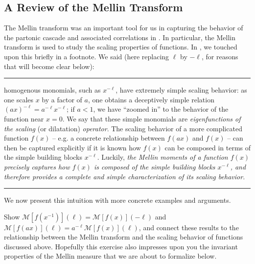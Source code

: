 \begin{subappendices}
\section{A Review of the Mellin Transform}
\label{app:mellin}

The Mellin transform was an important tool for us in capturing the behavior of the partonic cascade and associated correlations in .
%
In particular, the Mellin transform is used to study the scaling properties of functions.
%
In , we touched upon this briefly in a footnote.
%
We said (here replacing \(\ell\) by \(-\ell\), for reasons that will become clear below):

\vspace{7pt}
\hrule
\vspace{7pt}

homogenous monomials, such as \(x^{-\ell}\), have extremely simple scaling behavior:
%
as one scales \(x\) by a factor of \(a\), one obtains a deceptively simple relation \((a x)^{-\ell} = a^{-\ell} x^{-\ell}\);
%
if \(a < 1\), we have ``zoomed in'' to the behavior of the function near \(x = 0\).
%
We say that these simple monomials are \textit{eigenfunctions of the scaling} (or dilatation) \textit{operator}.
%
The scaling behavior of a more complicated function \(f(x)\) -- e.g. a concrete relationship between \(f(ax)\) and \(f(x)\) -- can then be captured explicitly if it is known how \(f(x)\) can be composed in terms of the simple building blocks \(x^{-\ell}\).
%
Luckily, \textit{the Mellin moments of a function \(f(x)\) precisely captures how \(f(x)\) is composed of the simple building blocks \(x^{-\ell}\), and therefore provides a complete and simple characterization of its scaling behavior.}

\vspace{7pt}
\hrule
\vspace{7pt}


We now present this intuition with more concrete examples and arguments.

\begin{exercise}
    Show \(\mathcal{M}[f(x^{-1})](\ell) = \mathcal{M}[f(x)](-\ell)\) and \(\mathcal{M}[f(a x)](\ell) = a^{-\ell} \mathcal{M}[f(x)](\ell)\), and connect these results to the relationship between the Mellin transform and the scaling behavior of functions discussed above.
    Hopefully this exercise also impresses upon you the invariant properties of the Mellin measure that we are about to formalize below.
\end{exercise}



\end{subappendices}
